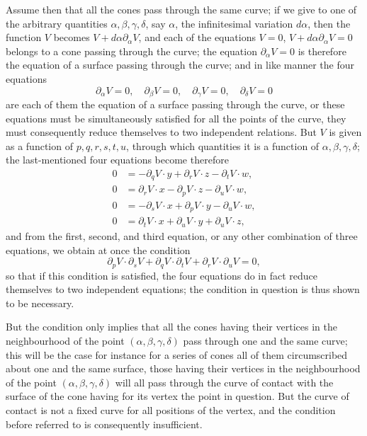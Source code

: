 \documentclass[11pt,a4paper]{article}
\theoremstyle{plain}
\begin{document}
Assume then that all the cones pass through the same curve; if we give to one of the arbitrary quantities $\alpha, \beta, \gamma, \delta$, say $\alpha$, the infinitesimal variation $d\alpha$, then the function $V$ becomes $V + d\alpha \partial_\alpha V$, and each of the equations $V = 0$, $V + d\alpha \partial_\alpha V = 0$ belongs to a cone passing through the curve; the equation $\partial_\alpha V = 0$ is therefore the equation of a surface passing through the curve; and in like manner the four equations
\[
\partial_\alpha V = 0,\quad \partial_\beta V = 0,\quad \partial_\gamma V = 0,\quad \partial_\delta V = 0
\]
are each of them the equation of a surface passing through the curve, or these equations must be simultaneously satisfied for all the points of the curve, they must consequently reduce themselves to two independent relations. But $V$ is given as a function of $p, q, r, s, t, u$, through which quantities it is a function of $\alpha, \beta, \gamma, \delta$; the last-mentioned four equations become therefore
\begin{align*}
0 &= -\partial_q V \cdot y + \partial_r V \cdot z - \partial_t V \cdot w,\\
0 &= \partial_r V \cdot x - \partial_p V \cdot z - \partial_u V \cdot w,\\
0 &= -\partial_s V \cdot x + \partial_p V \cdot y - \partial_u V \cdot w,\\
0 &= \partial_t V \cdot x + \partial_u V \cdot y + \partial_u V \cdot z,
\end{align*}
and from the first, second, and third equation, or any other combination of three equations, we obtain at once the condition
\[
\partial_p V \cdot \partial_s V + \partial_q V \cdot \partial_t V + \partial_r V \cdot \partial_u V = 0,
\]
so that if this condition is satisfied, the four equations do in fact reduce themselves to two independent equations; the condition in question is thus shown to be necessary.

But the condition only implies that all the cones having their vertices in the neighbourhood of the point $(\alpha, \beta, \gamma, \delta)$ pass through one and the same curve; this will be the case for instance for a series of cones all of them circumscribed about one and the same surface, those having their vertices in the neighbourhood of the point $(\alpha, \beta, \gamma, \delta)$ will all pass through the curve of contact with the surface of the cone having for its vertex the point in question. But the curve of contact is not a fixed curve for all positions of the vertex, and the condition before referred to is consequently insufficient.
\end{document}
